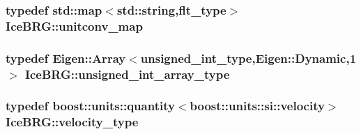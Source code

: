 \subsubsection[{unitconv\+\_\+map}]{\setlength{\rightskip}{0pt plus 5cm}typedef std\+::map$<$std\+::string,{\bf flt\+\_\+type}$>$ {\bf Ice\+B\+R\+G\+::unitconv\+\_\+map}}\label{namespaceIceBRG_a7dff9bcf80d56e9e3fc9d9e25c89ae68}
\hypertarget{namespaceIceBRG_ae27e6046fd8aeb0c4451b4836a03b31f}{}
\subsubsection[{unsigned\+\_\+int\+\_\+array\+\_\+type}]{\setlength{\rightskip}{0pt plus 5cm}typedef Eigen\+::\+Array$<${\bf unsigned\+\_\+int\+\_\+type},Eigen\+::\+Dynamic,1$>$ {\bf Ice\+B\+R\+G\+::unsigned\+\_\+int\+\_\+array\+\_\+type}}\label{namespaceIceBRG_ae27e6046fd8aeb0c4451b4836a03b31f}
\hypertarget{namespaceIceBRG_a34f8ef3b46f3408301e3c28197095eff}{}
\subsubsection[{velocity\+\_\+type}]{\setlength{\rightskip}{0pt plus 5cm}typedef boost\+::units\+::quantity$<$boost\+::units\+::si\+::velocity$>$ {\bf Ice\+B\+R\+G\+::velocity\+\_\+type}}\label{namespaceIceBRG_a34f8ef3b46f3408301e3c28197095eff}


